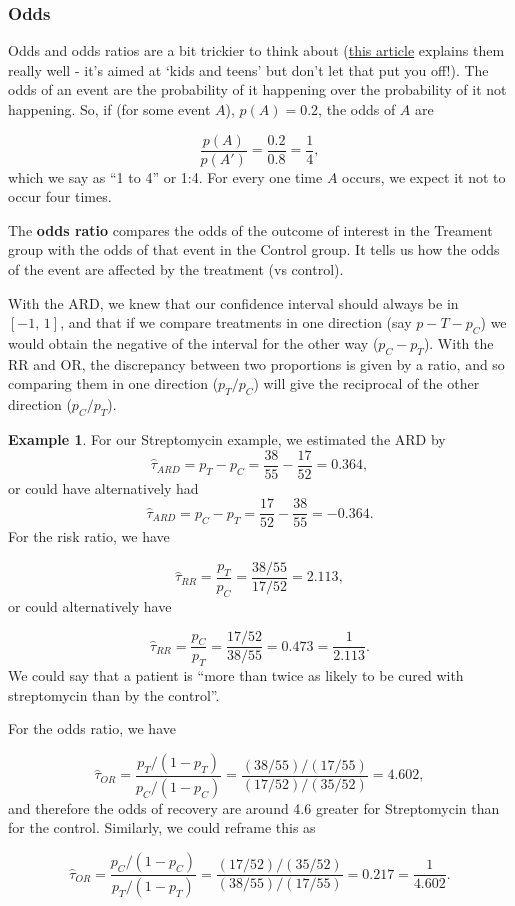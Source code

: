 \documentclass[
  openany]{book}
\theoremstyle{definition}
\theoremstyle{definition}
\newtheorem{example}{Example}[chapter]
\theoremstyle{definition}
\theoremstyle{definition}
\theoremstyle{remark}
\begin{document}
\hypertarget{odds}{%
\subsubsection*{Odds}\label{odds}}

Odds and odds ratios are a bit trickier to think about (\href{https://kids.frontiersin.org/articles/10.3389/frym.2022.926624\#:~:text=As\%20an\%20example\%2C\%20if\%20the,disease\%20if\%20you\%20are\%20exposed.}{this article} explains them really well - it's aimed at `kids and teens' but don't let that put you off!). The odds of an event are the probability of it happening over the probability of it not happening. So, if (for some event \(A\)), \(p\left(A\right)=0.2\), the odds of \(A\) are

\[\frac{p\left(A\right)}{p\left(A'\right)} = \frac{0.2}{0.8} = \frac{1}{4}, \]
which we say as ``1 to 4'' or 1:4. For every one time \(A\) occurs, we expect it not to occur four times.

The \textbf{odds ratio} compares the odds of the outcome of interest in the Treament group with the odds of that event in the Control group. It tells us how the odds of the event are affected by the treatment (vs control).

With the ARD, we knew that our confidence interval should always be in \(\left[-1,\,1\right]\), and that if we compare treatments in one direction (say \(p-T - p_C\)) we would obtain the negative of the interval for the other way (\(p_C - p_T\)). With the RR and OR, the discrepancy between two proportions is given by a ratio, and so comparing them in one direction (\(p_T / p_C\)) will give the reciprocal of the other direction (\(p_C / p_T\)).

\begin{example}
For our Streptomycin example, we estimated the ARD by
\[\hat\tau_{ARD}=p_T - p_C = \frac{38}{55} - \frac{17}{52} = 0.364,\]
or could have alternatively had
\[\hat\tau_{ARD}=p_C - p_T = \frac{17}{52} - \frac{38}{55} = - 0.364.\]
For the risk ratio, we have

\[\hat{\tau}_{RR} = \frac{p_T}{p_C} = \frac{38/55}{17/52} = 2.113,\]
or could alternatively have

\[\hat{\tau}_{RR} = \frac{p_C}{p_T} = \frac{17/52}{38/55} = 0.473 = \frac{1}{2.113}.\]
We could say that a patient is ``more than twice as likely to be cured with streptomycin than by the control''.

For the odds ratio, we have

\[\hat{\tau}_{OR} = \frac{p_T/\left(1-p_T\right)}{p_C/\left(1-p_C\right)} = \frac{(38/55)/(17/55)}{(17/52)/(35/52)} = 4.602, \]
and therefore the odds of recovery are around 4.6 greater for Streptomycin than for the control. Similarly, we could reframe this as

\[\hat{\tau}_{OR} = \frac{p_C/\left(1-p_C\right)}{p_T/\left(1-p_T\right)} = \frac{(17/52)/(35/52)}{(38/55)/(17/55)} = 0.217 = \frac{1}{4.602}.\]
\end{example}
\end{document}
